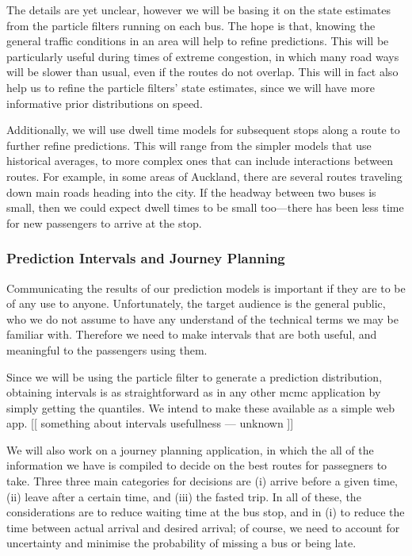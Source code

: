 \documentclass[12pt,a4paper]{article}
\begin{document}
The details are yet unclear,
however we will be basing it on the state estimates from the particle filters running
on each bus.
The hope is that, knowing the general traffic conditions in an area
will help to refine predictions.
This will be particularly useful during times of extreme congestion,
in which many road ways will be slower than usual,
even if the routes do not overlap.
This will in fact also help us to refine the particle filters' state estimates,
since we will have more informative prior distributions on speed.


Additionally, we will use dwell time models for subsequent stops along a route
to further refine predictions.
This will range from the simpler models that use historical averages,
to more complex ones that can include interactions between routes.
For example, in some areas of Auckland,
there are several routes traveling down main roads heading into the city.
If the headway between two buses is small,
then we could expect dwell times to be small too---there has been less time for
new passengers to arrive at the stop.




\subsubsection*{Prediction Intervals and Journey Planning}

Communicating the results of our prediction models is important if they are to be of any use to anyone.
Unfortunately, the target audience is the general public,
who we do not assume to have any understand of the technical terms we may be familiar with.
Therefore we need to make intervals that are both useful,
and meaningful to the passengers using them.


Since we will be using the particle filter to generate a prediction distribution,
obtaining intervals is as straightforward as in any other \gls{mcmc} application
by simply getting the quantiles.
We intend to make these available as a simple web app.
[[ something about intervals usefullness --- unknown ]]


We will also work on a journey planning application,
in which the all of the information we have is compiled to decide on the best
routes for passegners to take.
Three three main categories for decisions are
(i) arrive before a given time, (ii) leave after a certain time,
and (iii) the fasted trip.
In all of these, the considerations are to reduce waiting time at the bus stop,
and in (i) to reduce the time between actual arrival and desired arrival;
of course, we need to account for uncertainty and minimise the probability of missing a bus
or being late.
\end{document}
